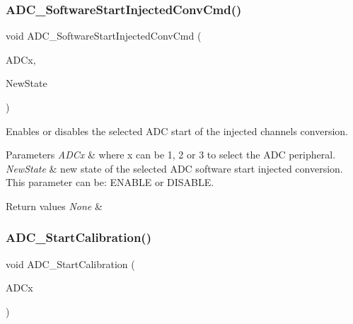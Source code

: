 \subsubsection{\texorpdfstring{ADC\_SoftwareStartInjectedConvCmd()}{ADC\_SoftwareStartInjectedConvCmd()}}
{\footnotesize\ttfamily void A\+D\+C\+\_\+\+Software\+Start\+Injected\+Conv\+Cmd (\begin{DoxyParamCaption}\item[{\mbox{\hyperlink{struct_a_d_c___type_def}{A\+D\+C\+\_\+\+Type\+Def}} $\ast$}]{A\+D\+Cx,  }\item[{\mbox{\hyperlink{group___exported__types_gac9a7e9a35d2513ec15c3b537aaa4fba1}{Functional\+State}}}]{New\+State }\end{DoxyParamCaption})}



Enables or disables the selected A\+DC start of the injected channels conversion. 


\begin{DoxyParams}{Parameters}
{\em A\+D\+Cx} & where x can be 1, 2 or 3 to select the A\+DC peripheral. \\
\hline
{\em New\+State} & new state of the selected A\+DC software start injected conversion. This parameter can be\+: E\+N\+A\+B\+LE or D\+I\+S\+A\+B\+LE. \\
\hline
\end{DoxyParams}

\begin{DoxyRetVals}{Return values}
{\em None} & \\
\hline
\end{DoxyRetVals}
\mbox{\label{group___a_d_c___private___functions_gadcba6341124a6aabfd2dd885ca8e5f14}} 
\subsubsection{\texorpdfstring{ADC\_StartCalibration()}{ADC\_StartCalibration()}}
{\footnotesize\ttfamily void A\+D\+C\+\_\+\+Start\+Calibration (\begin{DoxyParamCaption}\item[{\mbox{\hyperlink{struct_a_d_c___type_def}{A\+D\+C\+\_\+\+Type\+Def}} $\ast$}]{A\+D\+Cx }\end{DoxyParamCaption})}




